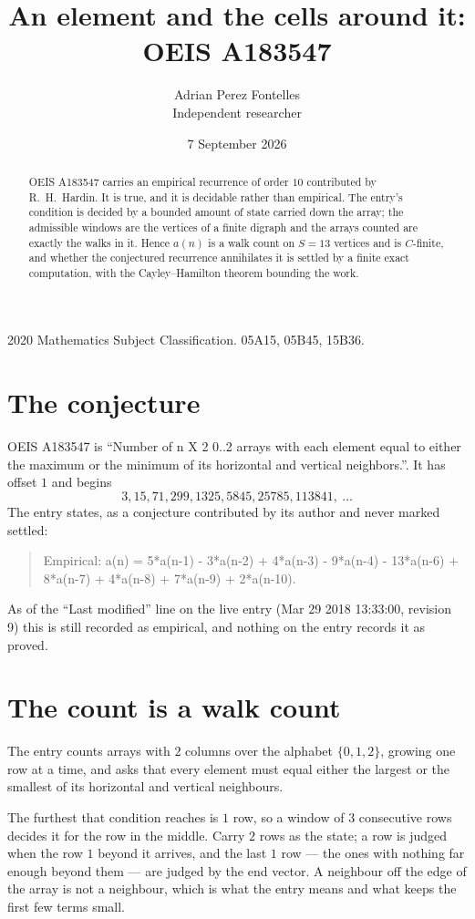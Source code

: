\documentclass[11pt,a4paper]{article}
\title{An element and the cells around it: OEIS A183547}
\author{Adrian Perez Fontelles\\ \small Independent researcher}
\date{7 September 2026}
\theoremstyle{plain}
\theoremstyle{definition}
\begin{document}
\maketitle

\begin{abstract}
OEIS A183547 carries an empirical recurrence of order $10$ contributed by R.~H.~Hardin. It is
true, and it is decidable rather than empirical. The entry's condition is decided by a bounded amount of state carried down the array; the
admissible windows are the vertices of a finite digraph and the arrays counted are exactly the
walks in it. Hence $a(n)$ is a walk count on $S=13$ vertices and is $C$-finite, and whether the
conjectured recurrence annihilates it is settled by a finite exact computation, with the
Cayley--Hamilton theorem bounding the work.
\end{abstract}

\noindent\small 2020 Mathematics Subject Classification. 05A15, 05B45, 15B36.\normalsize

\section{The conjecture}

OEIS A183547 is ``Number of n X 2 0..2 arrays with each element equal to either the maximum or the minimum of its horizontal and vertical neighbors.''. It has offset $1$ and begins
\[
3, 15, 71, 299, 1325, 5845, 25785, 113841,\ \dots
\]
The entry states, as a conjecture contributed by its author and never marked settled:
\begin{quote}
Empirical: a(n) = 5*a(n-1) - 3*a(n-2) + 4*a(n-3) - 9*a(n-4) - 13*a(n-6) + 8*a(n-7) + 4*a(n-8) + 7*a(n-9) + 2*a(n-10).
\end{quote}
As of the ``Last modified'' line on the live entry (Mar 29 2018 13:33:00, revision 9) this is still
recorded as empirical, and nothing on the entry records it as proved.

\section{The count is a walk count}

The entry counts arrays with $2$ columns over the alphabet $\{0,1,2\}$, growing one row at a time, and asks that every element must equal either the largest or the smallest of its horizontal and vertical neighbours.

The furthest that condition reaches is $1$ row, so a window of $3$ consecutive rows decides it for the row in the middle. Carry $2$ rows as the state; a row is judged when the row $1$ beyond it arrives, and the last $1$ row --- the ones with nothing far enough beyond them --- are judged by the end vector. A neighbour off the edge of the array is not a neighbour, which is what the entry means and what keeps the first few terms small.
\end{document}
